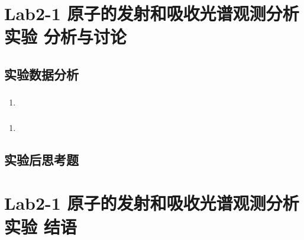 \documentclass[dvipsnames, svgnames,a4paper,11pt]{article}
\begin{document}
	\section{Lab2-1 原子的发射和吸收光谱观测分析实验 \quad\heiti 分析与讨论}
	
	\subsection{实验数据分析}
	
	\subsubsection{}
	\begin{enumerate}
		\item 
	\end{enumerate}
	
	\subsubsection{}
	\begin{enumerate}
		\item 
	\end{enumerate}
	
	\subsubsection{}
	
	
	\subsection{实验后思考题}
	
	\begin{question}
		
	\end{question}
	
	\begin{question}
		
	\end{question}
	
	\begin{question}
		
	\end{question}
	
	
	
	\clearpage
	
	\section{Lab2-1 原子的发射和吸收光谱观测分析实验 \quad\heiti 结语}
	
\end{document}
